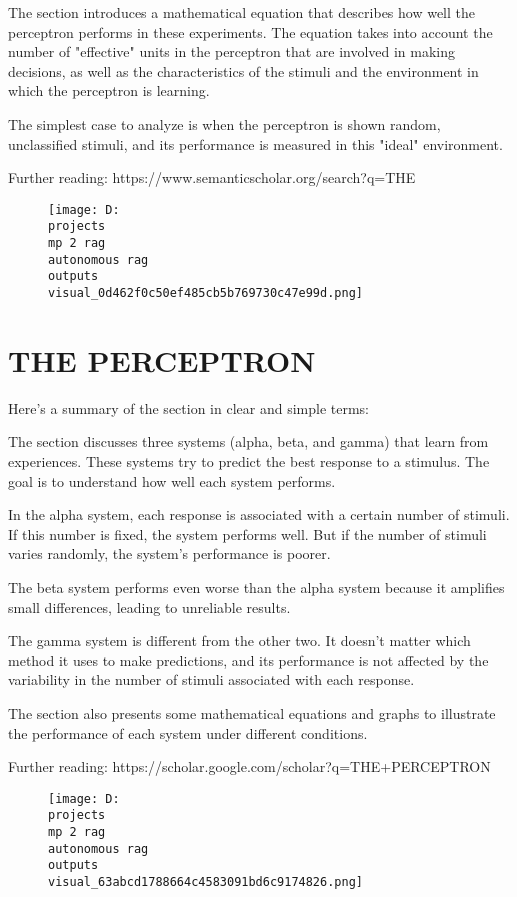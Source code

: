 \documentclass[12pt,a4paper]{article}
\begin{document}
The section introduces a mathematical equation that describes how well the perceptron performs in these experiments. The equation takes into account the number of "effective" units in the perceptron that are involved in making decisions, as well as the characteristics of the stimuli and the environment in which the perceptron is learning.

The simplest case to analyze is when the perceptron is shown random, unclassified stimuli, and its performance is measured in this "ideal" environment.

Further reading: https://www.semanticscholar.org/search?q=THE%
\begin{figure}[h]
\centering
\texttt{[image: D:\\projects\\mp 2 rag\\autonomous rag\\outputs\\visual\_0d462f0c50ef485cb5b769730c47e99d.png]}
\end{figure}
\section{THE PERCEPTRON}
Here's a summary of the section in clear and simple terms:

The section discusses three systems (alpha, beta, and gamma) that learn from experiences. These systems try to predict the best response to a stimulus. The goal is to understand how well each system performs.

In the alpha system, each response is associated with a certain number of stimuli. If this number is fixed, the system performs well. But if the number of stimuli varies randomly, the system's performance is poorer.

The beta system performs even worse than the alpha system because it amplifies small differences, leading to unreliable results.

The gamma system is different from the other two. It doesn't matter which method it uses to make predictions, and its performance is not affected by the variability in the number of stimuli associated with each response.

The section also presents some mathematical equations and graphs to illustrate the performance of each system under different conditions.

Further reading: https://scholar.google.com/scholar?q=THE+PERCEPTRON
\begin{figure}[h]
\centering
\texttt{[image: D:\\projects\\mp 2 rag\\autonomous rag\\outputs\\visual\_63abcd1788664c4583091bd6c9174826.png]}
\end{figure}
\end{document}
